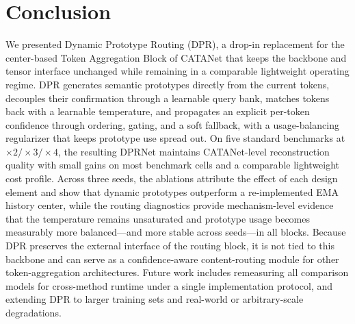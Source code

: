 \section{Conclusion}
\label{sec:conclusion}

We presented Dynamic Prototype Routing (DPR), a drop-in replacement for the
center-based Token Aggregation Block of CATANet that keeps the backbone and tensor
interface unchanged while remaining in a comparable lightweight operating regime. DPR generates semantic prototypes
directly from the current tokens, decouples their confirmation through a learnable
query bank, matches tokens back with a learnable temperature, and propagates an
explicit per-token confidence through ordering, gating, and a soft fallback, with a
usage-balancing regularizer that keeps prototype use spread out. On five standard
benchmarks at $\times2/\times3/\times4$, the resulting DPRNet maintains
CATANet-level reconstruction quality with small gains on most benchmark cells and a
comparable lightweight cost profile. Across three seeds, the ablations
attribute the effect of each design element and show that dynamic prototypes outperform a
re-implemented EMA history center, while the routing diagnostics provide mechanism-level
evidence that the temperature remains unsaturated and prototype usage becomes measurably more
balanced---and more stable across seeds---in all blocks. Because DPR preserves the external
interface of the routing block, it is not tied to this backbone and can serve as a
confidence-aware content-routing module for other token-aggregation architectures. Future work
includes remeasuring all comparison models for cross-method runtime under a single
implementation protocol, and extending DPR to larger training sets and real-world or
arbitrary-scale degradations.
